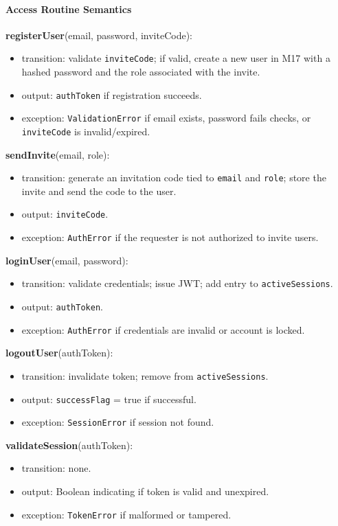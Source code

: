 \documentclass[12pt, titlepage]{article}
\begin{document}
\paragraph{Access Routine Semantics}

\noindent \textbf{registerUser}(email, password, inviteCode):
\begin{itemize}
  \item transition: validate \texttt{inviteCode}; if valid, create a new user in M17 with a hashed password and the role associated with the invite.
  \item output: \texttt{authToken} if registration succeeds.
  \item exception: \texttt{ValidationError} if email exists, password fails checks, or \texttt{inviteCode} is invalid/expired.
\end{itemize}

\noindent \textbf{sendInvite}(email, role):
\begin{itemize}
  \item transition: generate an invitation code tied to \texttt{email} and \texttt{role}; store the invite and send the code to the user.
  \item output: \texttt{inviteCode}.
  \item exception: \texttt{AuthError} if the requester is not authorized to invite users.
\end{itemize}

\noindent \textbf{loginUser}(email, password):
\begin{itemize}
  \item transition: validate credentials; issue JWT; add entry to \texttt{activeSessions}.
  \item output: \texttt{authToken}.
  \item exception: \texttt{AuthError} if credentials are invalid or account is locked.
\end{itemize}

\noindent \textbf{logoutUser}(authToken):
\begin{itemize}
  \item transition: invalidate token; remove from \texttt{activeSessions}.
  \item output: \texttt{successFlag} = true if successful.
  \item exception: \texttt{SessionError} if session not found.
\end{itemize}

\noindent \textbf{validateSession}(authToken):
\begin{itemize}
  \item transition: none.
  \item output: Boolean indicating if token is valid and unexpired.
  \item exception: \texttt{TokenError} if malformed or tampered.
\end{itemize}
\end{document}
